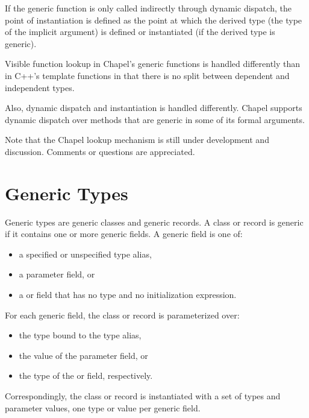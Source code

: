 If the generic function is only called indirectly through dynamic
dispatch, the point of instantiation is defined as the point at which
the derived type (the type of the implicit  argument) is
defined or instantiated (if the derived type is generic).

\begin{rationale}
Visible function lookup in Chapel's generic functions is handled
differently than in C++'s template functions in that there is no split
between dependent and independent types.

Also, dynamic dispatch and instantiation is handled differently.
Chapel supports dynamic dispatch over methods that are generic in some
of its formal arguments.

Note that the Chapel lookup mechanism is still under development and
discussion.  Comments or questions are appreciated.
\end{rationale}

\section{Generic Types}
\label{Generic_Types}

Generic types are generic classes and generic records.
A class or record is generic if it contains one or more
generic fields. A generic field is one of:
\begin{itemize}
\item a specified or unspecified type alias,
\item a parameter field, or
\item a  or  field that has no type and no initialization
expression.
\end{itemize}

For each generic field, the class or record is parameterized over:
\begin{itemize}
\item the type bound to the type alias,
\item the value of the parameter field, or
\item the type of the  or  field, respectively.
\end{itemize}
Correspondingly, the class or record is instantiated with a set
of types and parameter values, one type or value per generic field.

